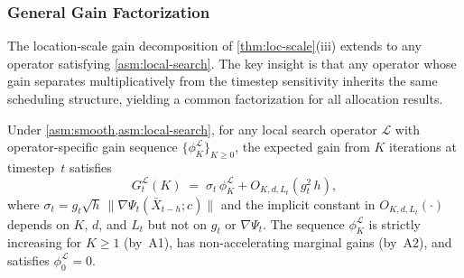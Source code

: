 \subsubsection{General Gain Factorization}
\label{sec:general-gain}

The location-scale gain decomposition of \cref{thm:loc-scale}(iii)
extends to any operator satisfying \cref{asm:local-search}.
The key insight is that any operator whose gain separates multiplicatively from the timestep sensitivity inherits the same scheduling structure, yielding a common factorization for all allocation results.

\begin{theorem}
\label{thm:general-gain}
Under \cref{asm:smooth,asm:local-search}, for any local search operator
$\mathcal{L}$ with operator-specific gain sequence
$\{\phi_K^{\mathcal{L}}\}_{K\ge 0}$, the expected gain from $K$
iterations at timestep~$t$ satisfies
\begin{equation}
  G_t^{\mathcal{L}}(K)
  \;=\;
  \sigma_t\,\phi_K^{\mathcal{L}}
  + O_{K,d,L_t}(g_t^2\,h),
  \label{eq:general-gain-factorization}
\end{equation}
where $\sigma_t=g_t\sqrt{h}\,\|\nabla\Psi_t(\bar{X}_{t-h};c)\|$
and the implicit constant in $O_{K,d,L_t}(\cdot)$ depends on $K$, $d$,
and $L_t$ but not on $g_t$ or $\nabla\Psi_t$.
The sequence $\phi_K^{\mathcal{L}}$ is strictly increasing for
$K\ge 1$ (by~A1), has non-accelerating marginal gains (by~A2),
and satisfies $\phi_0^{\mathcal{L}}=0$.
\end{theorem}

